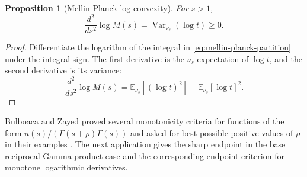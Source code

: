 \documentclass[11pt]{article}
\numberwithin{equation}{section}
\newtheorem{proposition}[theorem]{Proposition}
\theoremstyle{definition}
\theoremstyle{remark}
\DeclareMathOperator{\Var}{Var}
\newcommand{\E}{\mathbb E}
\newcommand{\1}{\mathbf 1}
\begin{document}
\begin{proposition}[Mellin-Planck log-convexity]
\label{prop:mellin-planck-log-convexity}
For \(s>1\),
\begin{equation}
\label{eq:mellin-planck-log-convexity}
\frac{d^2}{ds^2}\log M(s)=\Var_{\nu_s}(\log t)\ge0.
\end{equation}
\end{proposition}

\begin{proof}
Differentiate the logarithm of the integral in \eqref{eq:mellin-planck-partition} under the integral sign.  The first derivative is the \(\nu_s\)-expectation of \(\log t\), and the second derivative is its variance:
\begin{equation}
\label{eq:mellin-planck-variance-proof}
\frac{d^2}{ds^2}\log M(s)
=\E_{\nu_s}[(\log t)^2]-\E_{\nu_s}[\log t]^2.
\end{equation}
\end{proof}

Bulboaca and Zayed proved several monotonicity criteria for functions of the form
\(u(s)/(\Gamma(s+\rho)\Gamma(s))\) and asked for best possible positive
values of \(\rho\) in their examples \cite{bulboaca-zayed-gamma}.  The next
application gives the sharp endpoint in the base reciprocal Gamma-product
case and the corresponding endpoint criterion for monotone logarithmic
derivatives.
\end{document}
